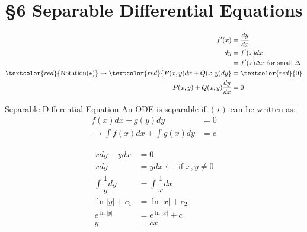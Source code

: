 \section*{\S 6 Separable Differential Equations}
\begin{align*}
    f'(x)&=\dfrac{dy}{dx}\\
    dy&=f'(x)dx\\
    &=f'(x)\Delta x \text{ for small } \Delta\\
    \textcolor{red}{\text{Notation} (\star )} \rightarrow \textcolor{red}{P(x,y)dx+Q(x,y)dy}&=\textcolor{red}{0}\\
    P(x,y)+Q(x,y) \dfrac{dy}{dx}&=0
\end{align*}
\begin{imp:defn}{Separable Differential Equation}{} An ODE is separable if $(\star )$ can be written as:
\begin{align*}
  f(x)dx+g(y)dy&=0 \\
  \rightarrow \int f(x)dx+\int g(x)dy &=c
\end{align*}
\end{imp:defn}
\begin{ex}
\begin{align*}
    xdy-ydx&=0\\
    xdy&=ydx \leftarrow \text{ if } x,y\neq 0\\
    \int \dfrac{1}{y} dy &= \int \dfrac{1}{x} dx\\
    \ln |y|+c_1 &= \ln |x| +c_2\\
    e^{\ln |y|} &= e^{\ln |x|} +c\\
    y &= cx
\end{align*}
\end{ex}
